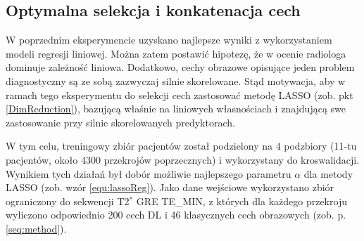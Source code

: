 \subsection{Optymalna selekcja i konkatenacja cech}
\label{seq:fusion}
W poprzednim eksperymencie uzyskano najlepsze wyniki z wykorzystaniem modeli regresji liniowej. Można zatem postawić hipotezę, że w ocenie radiologa dominuje zależność liniowa. Dodatkowo, cechy obrazowe opisujące jeden problem diagnostyczny są ze sobą zazwyczaj silnie skorelowane. Stąd motywacja, aby w ramach tego eksperymentu do selekcji cech zastosować metodę LASSO (zob. pkt \ref{DimReduction}), bazującą właśnie na liniowych własnościach i znajdującą swe zastosowanie przy silnie skorelowanych predyktorach.  

W tym celu, treningowy zbiór pacjentów został podzielony na 4 podzbiory (11-tu pacjentów, około 4300 przekrojów poprzecznych) i wykorzystany do kroswalidacji. Wynikiem tych działań był dobór możliwie najlepszego parametru $\alpha$ dla metody LASSO (zob. wzór \ref{equ:lassoReg}). Jako dane wejściowe wykorzystano zbiór ograniczony do sekwencji T2$^\ast$ GRE TE\_MIN, z których dla każdego przekroju wyliczono odpowiednio 200 cech DL i 46 klasycznych cech obrazowych (zob. p. \ref{seq:method}).

